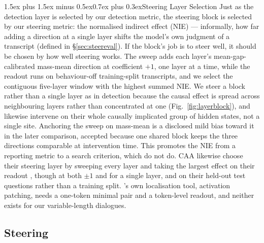 \documentclass[conference]{IEEEtran}
\makeatletter
\renewcommand{\subsubsection}{\@startsection{subsubsection}{3}{1em}%
  {1.5ex plus 1.5ex minus 0.5ex}{0.7ex plus 0.3ex}{\normalfont\normalsize\itshape}}
\makeatother
\begin{document}
\subsubsection{Steering Layer Selection}
Just as the detection layer is selected by our detection metric, the steering
block is selected by our steering metric: the normalised indirect effect (NIE)
--- informally, how far adding a direction at a single layer shifts the model's
own judgment of a transcript (defined in §\ref{sec:steereval}). If the block's
job is to steer well, it should be chosen by how well steering works. The sweep
adds each layer's mean-gap-calibrated mass-mean direction at coefficient $+1$,
one layer at a time, while the readout runs on behaviour-off training-split
transcripts, and we select the contiguous five-layer window with the highest summed NIE. We
steer a block rather than a single layer as in detection because the causal
effect is spread across neighbouring layers rather than concentrated at one
(Fig.~\ref{fig:layerblock}), and \citeauthor{marks2024} likewise intervene on
their whole causally implicated group of hidden states, not a single site.
Anchoring the sweep on mass-mean is a disclosed mild bias toward it in the
later comparison, accepted because one shared block keeps the three directions
comparable at intervention time. This promotes the NIE from a reporting metric
to a search criterion, which \citeauthor{marks2024} do not do. CAA likewise
choose their steering layer by sweeping every layer and taking the largest
effect on their readout \citep{rimsky2024}, though at both $\pm 1$ and for a
single layer, and on their held-out test questions rather than a training
split. \citeauthor{marks2024}'s own
localisation tool, activation patching, needs a one-token minimal pair and a
token-level readout, and neither exists for our variable-length dialogues.

\subsection{Steering}
\label{sec:steering}
\end{document}
